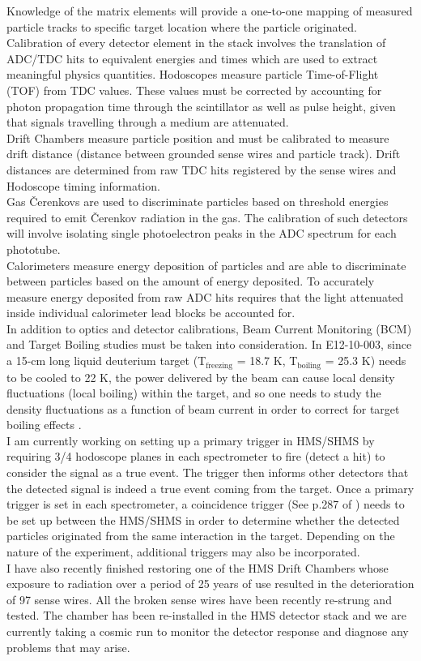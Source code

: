 \documentclass[8pt, twocolumn]{article}
\begin{document}
Knowledge of the matrix elements will provide a one-to-one mapping of measured particle tracks
to specific target location where the particle originated. \\
\indent Calibration of every detector element in the stack involves the translation of ADC/TDC hits
to equivalent energies  and times which are used to extract meaningful physics quantities.
Hodoscopes measure particle Time-of-Flight (TOF) from TDC values. These values must be corrected by
accounting for photon propagation time through the scintillator as well as pulse height, given that signals travelling
through a medium are attenuated.\\
\indent Drift Chambers measure particle position and must be calibrated to measure drift distance (distance between grounded sense wires and particle track).
Drift distances are determined from raw TDC hits registered by the sense wires and Hodoscope timing
information. \\ 
\indent Gas \v{C}erenkovs are used to discriminate particles based on threshold energies required to emit \v{C}erenkov radiation in the 
gas. The calibration of such detectors will involve isolating single photoelectron peaks in the ADC spectrum for each phototube.\\  
\indent Calorimeters measure energy deposition of particles and are able to discriminate between particles based on the
amount of energy deposited. To accurately measure energy deposited from raw ADC hits requires that the light attenuated
inside individual calorimeter lead blocks be accounted for. \\
\indent In addition to optics and detector calibrations, Beam Current Monitoring (BCM) and Target Boiling studies must be taken into consideration.
In E12-10-003, since a 15-cm long liquid deuterium target (T$_{\text{freezing}}$ = 18.7 K, T$_{\text{boiling}}$ = 25.3 K) needs to be cooled to 22 K, the power delivered by the beam can cause local
density fluctuations (local boiling) within the target, and so one needs to study the density fluctuations as a function of beam current in
order to correct for target boiling effects \cite{ibrahim}.\\   
\indent I am currently working on setting up a primary trigger in HMS/SHMS by
requiring 3/4 hodoscope planes in each spectrometer to fire (detect a hit) to consider the signal as 
a true event. The trigger then informs other detectors that the detected
signal is indeed a true event coming from the target. Once a primary trigger is set in
each spectrometer, a coincidence trigger (See p.287 of \cite{Leo}) needs 
to be set up between the HMS/SHMS in order to determine whether the detected particles originated
from the same interaction in the target. Depending on the nature of the experiment, additional triggers
may also be incorporated. \\
\indent I have also recently finished restoring one of the HMS Drift Chambers whose
exposure to radiation over a period of 25 years of use resulted in the
deterioration of 97 sense wires. All the broken sense wires
have been recently re-strung and tested. The chamber has been re-installed
in the HMS detector stack and we are currently taking a cosmic run to
monitor the detector response and diagnose any problems that may arise.

\newpage
\onecolumn


\end{document}
